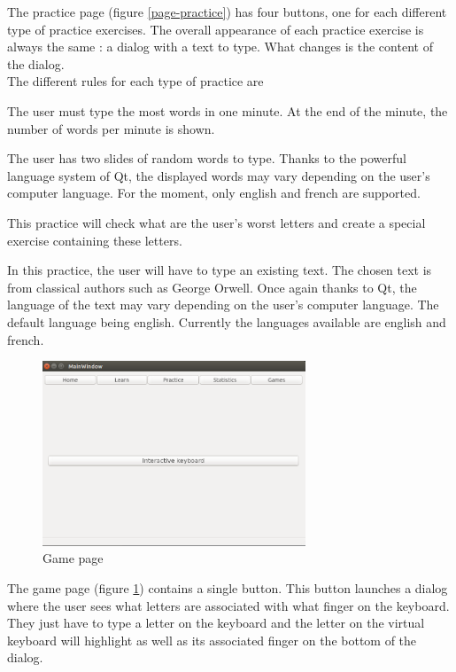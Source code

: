 The practice page  (figure \ref{page-practice}) has four buttons, one for each different type of practice exercises. The overall appearance of each practice exercise is always the same : a dialog with a text to type. What changes is the content of the dialog.\\
The different rules for each type of practice are 
\begin{description}[align=left]
	\item[Against time/Race :] The user must type the most words in one minute. At the end of the minute, the number of words per minute is shown.
	\item[Normal :] The user has two slides of random words to type. Thanks to the powerful language system of Qt, the displayed words may vary depending on the user's computer language. For the moment, only english and french are supported.
	\item[Improve :] This practice will check what are the user's worst letters and create a special exercise containing these letters.
	\item[Text :] In this practice, the user will have to type an existing text. The chosen text is from classical authors such as George Orwell. Once again thanks to Qt, the language of the text may vary depending on the user's computer language. The default language being english. Currently the languages available are english and french.
\end{description}


\begin{figure}[H]
	\centering
	\includegraphics[width=0.7\textwidth]{images/page-games.png}
	 \caption{Game page}
	 \label{page-game}
\end{figure}

The game page (figure \ref{page-game}) contains a single button. This button launches a dialog where the user sees what letters are associated with what finger on the keyboard. They just have to type a letter on the keyboard and the letter on the virtual keyboard will highlight as well as its associated finger on the bottom of the dialog.

